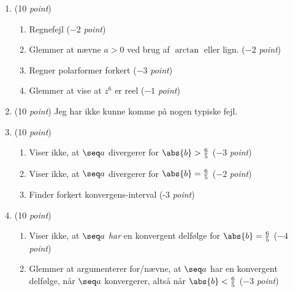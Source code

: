\documentclass{article}
\begin{document}
\begin{opg}\hfill
	\begin{enumerate}
		\item (10 \emph{point})\begin{enumerate}[label=(\roman*)]
			\item Regnefejl ($ -2 $ \textit{point})
			\item Glemmer at nævne $ a>0 $ ved brug af $ \arctan $ eller lign. ($ -2 $\textit{ point})
			\item Regner polarformer forkert ($ -3 $ \emph{point})
			\item Glemmer at vise at $ z^6 $ er reel ($ -1 $ \emph{point})
		\end{enumerate}
		\item (10 \emph{point}) Jeg har ikke kunne komme på nogen typiske fejl.
		\item (10 \emph{point})\begin{enumerate}[label=(\roman*)]
			\item Viser ikke, at $ \seq
			 a $ divergerer for $ \abs{b}>\frac{6}{5} $ ($ -3 $ \emph{point})
			\item Viser ikke, at $ \seq a $ divergerer for $ \abs{b}=\frac{6}{5} $ ($ -2 $ \emph{point})
			\item Finder forkert konvergens-interval (-3 \emph{point})
		\end{enumerate}
		\item (10 \emph{point})\begin{enumerate}[label=(\roman*)]
			\item Viser ikke, at $ \seq a $ \emph{har} en konvergent delfølge for $ \abs{b}=\frac{6}{5} $ ($ -4 $ \emph{point})
			\item Glemmer at argumenterer for/nævne, at $ \seq a $ har en konvergent delfølge, når $ \seq a $ konvergerer, altså når $ \abs{b}<\frac{6}{5} $ ($ -3 $ \emph{point})
		\end{enumerate}
	\end{enumerate}	
\end{opg}
\end{document}
